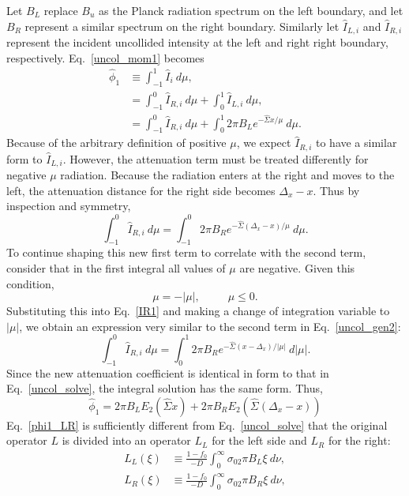 Let $B_L$ replace $B_u$ as the Planck radiation spectrum on the left boundary,
and let $B_R$ represent a similar spectrum on the right boundary.  Similarly
let $\hat I_{L,i}$ and $\hat I_{R,i}$ represent the incident uncollided
intensity at the left and right right boundary, respectively.  Eq.\
\eqref{uncol_mom1} becomes
\begin{align}
\hat\phi_1&\equiv\int_{-1}^1 \hat I_i\ d\mu \nonumber ,\\
&=\int_{-1}^0 \hat I_{R,i}\ d\mu + 
  \int_0^1 \hat I_{L,i}\ d\mu \nonumber ,\\
&=\int_{-1}^0 \hat I_{R,i}\ d\mu +
  \int_0^1 2\pi B_Le^{-\hat\Sigma x/\mu}\ d\mu. \label{uncol_gen2}
\end{align}
Because of the arbitrary definition of positive $\mu$, we expect $\hat I_{R,i}$
to have a similar form to $\hat I_{L,i}$.  However, the attenuation term must
be treated differently for negative $\mu$ radiation.  Because the radiation
enters at the right and moves to the left, the attenuation distance for the
right side becomes $\Delta_x-x$. Thus by inspection and symmetry,
\begin{equation}
\int_{-1}^0 \hat I_{R,i}\ d\mu
  =\int_{-1}^0 2\pi B_R e^{-\hat\Sigma(\Delta_x-x)/\mu}\ d\mu.\label{IR1}
\end{equation}
To continue shaping this new first term to correlate with the second term,
consider that in the first integral all values of $\mu$ are negative.  Given
this condition,
\[\mu=-|\mu|, \hspace{30pt} \mu\leq0.\]
Substituting this into Eq.\ \eqref{IR1} and making a change of integration
variable to $|\mu|$, we obtain an expression very similar to the second term in
Eq.\ \eqref{uncol_gen2}:
\begin{equation}
\int_{-1}^0 \hat I_{R,i}\ d\mu = \int_0^1 2\pi B_R
  e^{-\hat\Sigma(x-\Delta_x)/|\mu|}\ d|\mu|.
\end{equation}
Since the new attenuation coefficient is identical in form to that in Eq.\
\eqref{uncol_solve}, the integral solution has the same form.  Thus,
\begin{equation}
\hat\phi_1=2\pi B_LE_2(\hat\Sigma x) +
  2\pi B_RE_2\left(\hat\Sigma(\Delta_x-x)\right) \label{phi1_LR}
\end{equation}
Eq.\ \eqref{phi1_LR} is sufficiently different from Eq.\ \eqref{uncol_solve}
that the original operator $L$ is divided into an operator $L_L$ for the left
side and $L_R$ for the right:
\begin{subequations}
\begin{align}\label{L_LR}
L_L(\xi)&\equiv\frac{1-f_0}{-D}\int_0^\infty\sigma_02\pi B_L\xi\ d\nu, \\
L_R(\xi)&\equiv\frac{1-f_0}{-D}\int_0^\infty\sigma_02\pi B_R\xi\ d\nu,
\end{align}
\end{subequations}
